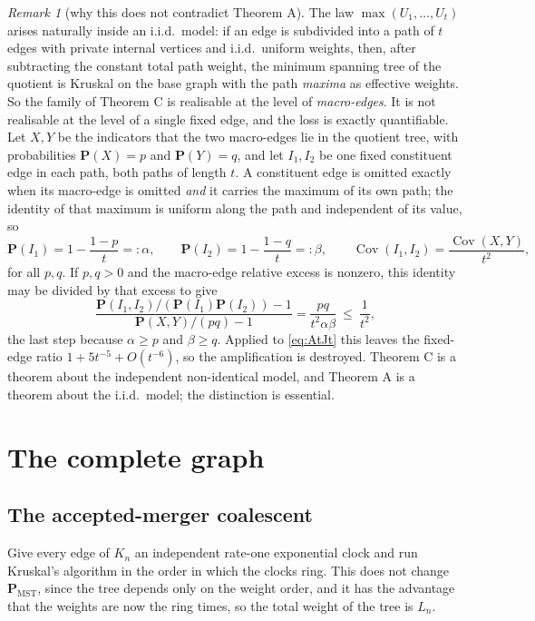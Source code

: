 \documentclass[11pt,a4paper]{amsart}
\theoremstyle{plain}
\theoremstyle{definition}
\theoremstyle{remark}
\newtheorem{remark}[theorem]{Remark}
\newcommand{\PMST}{\mathbf{P}_{\mathrm{MST}}}
\newcommand{\PP}{\mathbf{P}}
\begin{document}
\begin{remark}[why this does not contradict Theorem A]
\label{rem:attenuation}
The law $\max(U_1,\dots,U_t)$ arises naturally inside an i.i.d.\ model: if an edge
is subdivided into a path of $t$ edges with private internal vertices and i.i.d.\
uniform weights, then, after subtracting the constant total path weight, the
minimum spanning tree of the quotient is Kruskal on the base graph with the path
\emph{maxima} as effective weights. So the family of Theorem C is realisable at
the level of \emph{macro-edges}. It is not realisable at the level of a single
fixed edge, and the loss is exactly quantifiable. Let $X,Y$ be the indicators
that the two macro-edges lie in the quotient tree, with probabilities
$\PP(X)=p$ and $\PP(Y)=q$, and let $I_1,I_2$ be one fixed constituent edge in
each path, both paths of length $t$. A constituent edge is omitted exactly when
its macro-edge is omitted \emph{and} it carries the maximum of its own path; the
identity of that maximum is uniform along the path and independent of its value,
so
\[
\PP(I_1)=1-\frac{1-p}t=:\alpha,\qquad
\PP(I_2)=1-\frac{1-q}t=:\beta,\qquad
\operatorname{Cov}(I_1,I_2)=\frac{\operatorname{Cov}(X,Y)}{t^2},
\]
for all $p,q$. If $p,q>0$ and the macro-edge relative excess is nonzero, this
identity may be divided by that excess to give
\[
\frac{\PP(I_1,I_2)/(\PP(I_1)\PP(I_2))-1}{\PP(X,Y)/(pq)-1}
=\frac{pq}{t^2\alpha\beta}\ \le\ \frac1{t^2},
\]
the last step because $\alpha\ge p$ and $\beta\ge q$.
Applied to \eqref{eq:AtJt} this leaves the fixed-edge ratio
$1+5t^{-5}+O(t^{-6})$, so the amplification is destroyed. Theorem C is a theorem
about the independent non-identical model, and Theorem A is a theorem about the
i.i.d.\ model; the distinction is essential.
\end{remark}

\section{The complete graph}
\label{sec:kn}

\subsection{The accepted-merger coalescent}

Give every edge of $K_n$ an independent rate-one exponential clock and run
Kruskal's algorithm in the order in which the clocks ring. This does not change
$\PMST$, since the tree depends only on the weight order, and it has the
advantage that the weights are now the ring times, so the total weight of the
tree is $L_n$.
\end{document}
